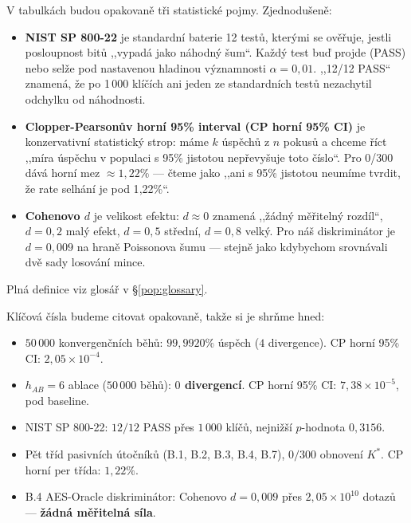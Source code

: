 \documentclass[11pt,a4paper]{article}
\begin{document}
\begin{tldr}
V tabulkách budou opakovaně tři statistické pojmy. Zjednodušeně:
\begin{itemize}[leftmargin=*]
\item \textbf{NIST SP 800-22} je standardní baterie 12 testů, kterými se ověřuje, jestli posloupnost bitů ,,vypadá jako náhodný šum``. Každý test buď projde (PASS) nebo selže pod nastavenou hladinou významnosti $\alpha = 0{,}01$. ,,12/12 PASS`` znamená, že po 1\,000 klíčích ani jeden ze standardních testů nezachytil odchylku od náhodnosti.
\item \textbf{Clopper-Pearsonův horní 95\% interval (CP horní 95\% CI)} je konzervativní statistický strop: máme $k$ úspěchů z $n$ pokusů a chceme říct ,,míra úspěchu v populaci s 95\% jistotou nepřevyšuje toto číslo``. Pro 0/300 dává horní mez $\approx 1{,}22\%$ --- čteme jako ,,ani s 95\% jistotou neumíme tvrdit, že rate selhání je pod 1{,}22\%``.
\item \textbf{Cohenovo $d$} je velikost efektu: $d \approx 0$ znamená ,,žádný měřitelný rozdíl``, $d = 0{,}2$ malý efekt, $d = 0{,}5$ střední, $d = 0{,}8$ velký. Pro náš diskriminátor je $d = 0{,}009$ na hraně Poissonova šumu --- stejně jako kdybychom srovnávali dvě sady losování mince.
\end{itemize}
Plná definice viz glosář v \S\ref{pop:glossary}.
\end{tldr}

Klíčová čísla budeme citovat opakovaně, takže si je shrňme hned:

\begin{tldr}
\begin{itemize}[leftmargin=*]
\item $50\,000$ konvergenčních běhů: $99{,}9920\%$ úspěch ($4$ divergence). CP horní 95\% CI: $2{,}05 \times 10^{-4}$.
\item $h_{AB}=6$ ablace ($50\,000$ běhů): \textbf{$0$ divergencí}. CP horní 95\% CI: $7{,}38 \times 10^{-5}$, pod baseline.
\item NIST SP 800-22: $12/12$ PASS přes $1\,000$ klíčů, nejnižší $p$-hodnota $0{,}3156$.
\item Pět tříd pasivních útočníků (B.1, B.2, B.3, B.4, B.7), $0/300$ obnovení $K^*$. CP horní per třída: $1{,}22\%$.
\item B.4 AES-Oracle diskriminátor: Cohenovo $d = 0{,}009$ přes $2{,}05 \times 10^{10}$ dotazů --- \textbf{žádná měřitelná síla}.
\end{itemize}
\end{tldr}
\end{document}
